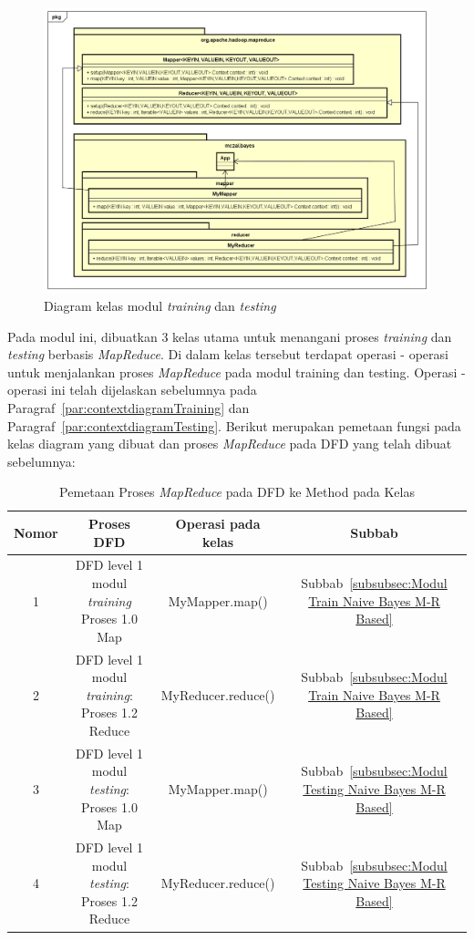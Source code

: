 \begin{figure}[H]
	\centering
	\includegraphics[scale=0.54]{ClassDiagram/Class_Diagram_Train_Test_MR}
	\caption[Diagram kelas modul \textit{training} dan \textit{testing}]{Diagram kelas modul \textit{training} dan \textit{testing}}
	\label{fig:Diagram kelas modul training dan testing}
\end{figure}

Pada modul ini, dibuatkan 3 kelas utama untuk menangani proses \textit{training} dan \textit{testing} berbasis \textit{MapReduce}. Di dalam kelas tersebut terdapat operasi - operasi untuk menjalankan proses \textit{MapReduce} pada modul training dan testing. Operasi - operasi ini telah dijelaskan sebelumnya pada Paragraf~\ref{par:contextdiagramTraining} dan Paragraf~\ref{par:contextdiagramTesting}. Berikut merupakan pemetaan fungsi pada kelas diagram yang dibuat dan proses \textit{MapReduce} pada DFD yang telah dibuat sebelumnya:

\begin{table}[H]
	\label{tab:mapDFDProcesstoClassDiagramFunction}
	\centering
	\caption{Pemetaan Proses \textit{MapReduce} pada DFD ke Method pada Kelas}
	\begin{tabular}{ | c | c | c | c | }
	\hline
	Nomor & Proses DFD & Operasi pada kelas & Subbab\\ \hline \hline
	1 & DFD level 1 modul \textit{training} Proses 1.0 Map & MyMapper.map() & Subbab~\ref{subsubsec:Modul Train Naive Bayes M-R Based} \\ \hline
	2 & DFD level 1 modul \textit{training}: Proses 1.2 Reduce & MyReducer.reduce() & Subbab~\ref{subsubsec:Modul Train Naive Bayes M-R Based} \\ \hline
	3 & DFD level 1 modul \textit{testing}: Proses 1.0 Map & MyMapper.map() & Subbab~\ref{subsubsec:Modul Testing Naive Bayes M-R Based} \\ \hline
	4 & DFD level 1 modul \textit{testing}: Proses 1.2 Reduce & MyReducer.reduce() & Subbab~\ref{subsubsec:Modul Testing Naive Bayes M-R Based} \\ \hline
	\end{tabular}
\end{table}


